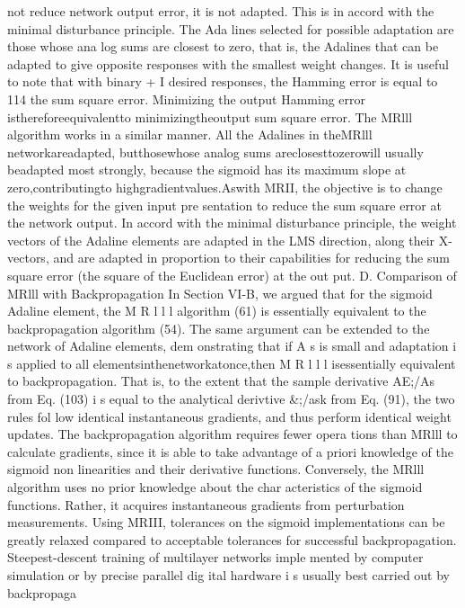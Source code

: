 \documentclass[11pt,a4paper,twocolumn]{article}
\begin{document}
{{not reduce network output error, it is not adapted. This is 
in accord with the minimal disturbance principle. The Ada
lines selected for possible adaptation are those whose ana
log sums are closest to zero, that is, the Adalines that can 
be adapted to give opposite responses with the smallest 
weight changes. It is useful to note that with binary + I  
desired responses, the Hamming error is equal to 114 the 
sum square error. Minimizing the output Hamming error 
isthereforeequivalentto minimizingtheoutput sum square 
error. 
The MRlll algorithm works in a similar manner. All the 
Adalines in theMRlll networkareadapted, butthosewhose 
analog sums areclosesttozerowill usually beadapted most 
strongly, because the sigmoid has its maximum slope at 
zero,contributingto highgradientvalues.Aswith MRII, the 
objective is to change the weights for the given input pre
sentation to reduce the sum square error at the network 
output. In accord with the minimal disturbance principle, 
the weight vectors of the Adaline elements are adapted in 
the LMS direction, along their X-vectors, and are adapted 
in proportion to their capabilities for reducing the sum 
square error (the square of the Euclidean error) at the out
put. 
D. Comparison of MRlll with Backpropagation 
In Section VI-B, we argued that for the sigmoid Adaline 
element, the M R l l l  algorithm (61) is essentially equivalent 
to the backpropagation algorithm (54). The same argument 
can be extended to the network of Adaline elements, dem
onstrating that if A s  is small and adaptation i s  applied to 
all elementsinthenetworkatonce,then M R l l l  isessentially 
equivalent to backpropagation. That is, to the extent that 
the sample derivative AE;/As from Eq. (103) i s  equal to the 
analytical derivtive \&;/ask 
from Eq. (91), the two rules fol
low identical instantaneous gradients, and thus perform 
identical weight updates. 
The backpropagation algorithm requires fewer opera
tions than MRlll to calculate gradients, since it is able to 
take advantage of a priori knowledge of the sigmoid non
linearities and their derivative functions. Conversely, the 
MRlll algorithm uses no prior knowledge about the char
acteristics of the sigmoid functions. Rather, it acquires 
instantaneous gradients from perturbation measurements. 
Using MRIII, tolerances on the sigmoid implementations 
can be greatly relaxed compared to acceptable tolerances 
for successful backpropagation. 
Steepest-descent training of multilayer networks imple
mented by computer simulation or by precise parallel dig
ital hardware i s  usually best carried out by backpropaga
}}
\end{document}
